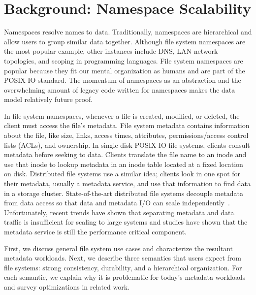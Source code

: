 \chapter{Background: Namespace Scalability}
\label{related-work}

Namespaces resolve names to data. Traditionally, namespaces are hierarchical
and allow users to group similar data together. Although file system namespaces
are the most popular example, other instances include DNS, LAN network
topologies, and scoping in programming languages.  File system namespaces are
popular because they fit our mental organization as humans and are part of the
POSIX IO standard. The momentum of namespaces as an abstraction and the
overwhelming amount of legacy code written for namespaces makes the data model
relatively future proof.

In file system namespaces, whenever a file is created, modified, or deleted,
the client must access the file's metadata. File system metadata contains
information about the file, like size, links, access times, attributes,
permissions/access control lists (ACLs), and ownership.  In single disk POSIX
IO file systems, clients consult metadata before seeking to data. Clients
translate the file name to an inode and use that inode to lookup metadata in an
inode table located at a fixed location on disk.  Distributed file systems use
a similar idea; clients look in one spot for their metadata, usually a metadata
service, and use that information to find data in a storage cluster.
State-of-the-art distributed file systems decouple metadata from data access so
that data and metadata I/O can scale
independently~\cite{alam:pdsw2011-metadata-scaling, ghemawat:sosp2003-gfs,
hildebrand:msst2005-pnfs, weil:osdi2006-ceph, welch:fast2008-panasas,
xing:sc2009-skyfs}.  Unfortunately, recent trends have shown that separating
metadata and data traffic is insufficient for scaling to large systems and
studies have shown that the metadata service is still the performance critical
component. 

First, we discuss general file system use cases and characterize the resultant
metadata workloads. Next, we describe three semantics that users expect from
file systems: strong consistency, durability, and a hierarchical organization.
For each semantic, we explain why it is problematic for today's metadata
workloads and survey optimizations in related work.

